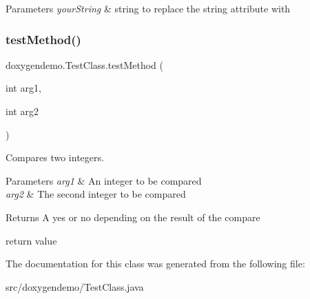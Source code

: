 \begin{DoxyParams}{Parameters}
{\em your\+String} & string to replace the string attribute with \\
\hline
\end{DoxyParams}
\mbox{\label{classdoxygendemo_1_1_test_class_abbd911a5398278ff404a9f08935debbb}} 
\subsubsection{\texorpdfstring{test\+Method()}{testMethod()}}
{\footnotesize\ttfamily doxygendemo.\+Test\+Class.\+test\+Method (\begin{DoxyParamCaption}\item[{int}]{arg1,  }\item[{int}]{arg2 }\end{DoxyParamCaption})}



Compares two integers. 


\begin{DoxyParams}{Parameters}
{\em arg1} & An integer to be compared \\
\hline
{\em arg2} & The second integer to be compared \\
\hline
\end{DoxyParams}
\begin{DoxyReturn}{Returns}
A yes or no depending on the result of the compare 
\end{DoxyReturn}
return value 

The documentation for this class was generated from the following file\+:\begin{DoxyCompactItemize}
\item 
src/doxygendemo/Test\+Class.\+java\end{DoxyCompactItemize}
